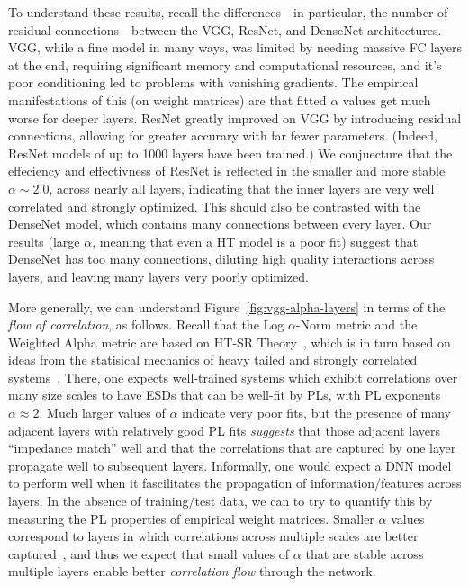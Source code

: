 To understand these results, recall the differences---in particular, the number of residual connections---between the VGG, ResNet, and DenseNet architectures.
VGG, while a fine model in many ways, was limited by needing massive FC layers at the end, requiring significant memory and computational resources, and it's poor conditioning led to problems with vanishing gradients.  
The empirical manifestations of this (on weight matrices) are that fitted $\alpha$ values get much worse for deeper layers.
ResNet greatly improved on VGG by introducing residual connections, allowing for greater accurary with far fewer parameters.
(Indeed, ResNet models of up to 1000 layers have been trained.) 
We conjuecture that the effeciency and effectivness of ResNet is reflected in the smaller and more stable $\alpha\sim 2.0$, across nearly all layers, indicating that the inner layers are very well correlated and strongly optimized.
This should also be contrasted with the DenseNet model, which contains many connections between every layer.
Our results (large $\alpha$, meaning that even a HT model is a poor fit) suggest that DenseNet has too many connections, diluting high quality interactions across layers, and leaving many layers very poorly optimized.

More generally, we can understand Figure~\ref{fig:vgg-alpha-layers} in terms of the \emph{flow of correlation}, as follows.
Recall that the Log $\alpha$-Norm metric and the Weighted Alpha metric are based on HT-SR Theory~\cite{MM18_TR, MM19_HTSR_ICML, MM20_SDM}, which is in turn based on ideas from the statisical mechanics of heavy tailed and strongly correlated systems~\cite{BouchaudPotters03, SornetteBook, BP11, bun2017}. 
There, one expects well-trained systems which exhibit correlations over many size scales to have ESDs that can be well-fit by PLs, with PL exponents $\alpha\approx 2$.
Much larger values of $\alpha$ indicate very poor fits, but the presence of many adjacent layers with relatively good PL fits \emph{suggests} that those adjacent layers ``impedance match'' well and that the correlations that are captured by one layer propagate well to subsequent layers.
Informally, one would expect a DNN model to perform well when it fascilitates the propagation of information/features across layers.
In the absence of training/test data, we can to try to quantify this by measuring the PL properties of empirical weight matrices.
Smaller $\alpha$ values correspond to layers in which correlations across multiple scales are better captured~\cite{MM18_TR,SornetteBook}, and thus we expect that small values of $\alpha$ that are stable across multiple layers enable better \emph{correlation flow} through the network.


